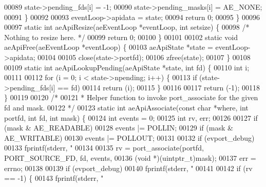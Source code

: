 \begin{DoxyCode}
00089         state->pending\_fds[i] = -1;
00090         state->pending\_masks[i] = AE\_NONE;
00091     \}
00092 
00093     eventLoop->apidata = state;
00094     \textcolor{keywordflow}{return} 0;
00095 \}
00096 
00097 \textcolor{keyword}{static} \textcolor{keywordtype}{int} aeApiResize(aeEventLoop *eventLoop, \textcolor{keywordtype}{int} setsize) \{
00098     \textcolor{comment}{/* Nothing to resize here. */}
00099     \textcolor{keywordflow}{return} 0;
00100 \}
00101 
00102 \textcolor{keyword}{static} \textcolor{keywordtype}{void} aeApiFree(aeEventLoop *eventLoop) \{
00103     aeApiState *state = eventLoop->apidata;
00104 
00105     close(state->portfd);
00106     zfree(state);
00107 \}
00108 
00109 \textcolor{keyword}{static} \textcolor{keywordtype}{int} aeApiLookupPending(aeApiState *state, \textcolor{keywordtype}{int} fd) \{
00110     \textcolor{keywordtype}{int} i;
00111 
00112     \textcolor{keywordflow}{for} (i = 0; i < state->npending; i++) \{
00113         \textcolor{keywordflow}{if} (state->pending\_fds[i] == fd)
00114             \textcolor{keywordflow}{return} (i);
00115     \}
00116 
00117     \textcolor{keywordflow}{return} (-1);
00118 \}
00119 
00120 \textcolor{comment}{/*}
00121 \textcolor{comment}{ * Helper function to invoke port\_associate for the given fd and mask.}
00122 \textcolor{comment}{ */}
00123 \textcolor{keyword}{static} \textcolor{keywordtype}{int} aeApiAssociate(\textcolor{keyword}{const} \textcolor{keywordtype}{char} *where, \textcolor{keywordtype}{int} portfd, \textcolor{keywordtype}{int} fd, \textcolor{keywordtype}{int} mask) \{
00124     \textcolor{keywordtype}{int} events = 0;
00125     \textcolor{keywordtype}{int} rv, err;
00126 
00127     \textcolor{keywordflow}{if} (mask & AE\_READABLE)
00128         events |= POLLIN;
00129     \textcolor{keywordflow}{if} (mask & AE\_WRITABLE)
00130         events |= POLLOUT;
00131 
00132     \textcolor{keywordflow}{if} (evport\_debug)
00133         fprintf(stderr, \textcolor{stringliteral}{"%
00134 
00135     rv = port\_associate(portfd, PORT\_SOURCE\_FD, fd, events,
00136         (\textcolor{keywordtype}{void} *)(uintptr\_t)mask);
00137     err = errno;
00138 
00139     \textcolor{keywordflow}{if} (evport\_debug)
00140         fprintf(stderr, \textcolor{stringliteral}{"%
00141 
00142     \textcolor{keywordflow}{if} (rv == -1) \{
00143         fprintf(stderr, \textcolor{stringliteral}{"%
}}}
\end{DoxyCode}
